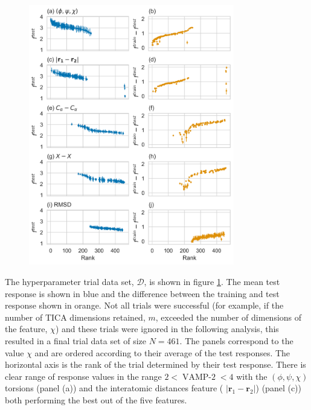 \begin{figure}[p]
    \centering
    \includegraphics[width=0.8\textwidth]{chapters/msm_optimization/figures/aadh_train_test_results.png}
    \label{fig:aad_train_test}
\end{figure}

The hyperparameter trial data set, $\mathcal{D}$, is shown in figure \ref{fig:aad_train_test}. The mean test response is shown in blue and the difference between the training and test response shown in orange. Not all trials were successful (for example, if the number of TICA dimensions retained, $m$, exceeded the number of dimensions of the feature, $\chi$) and these trials were ignored in the following analysis, this resulted in a final trial data set of size $N=461$. The panels correspond to the value $\chi$ and are ordered according to their average of the test responses. The horizontal axis is the rank of the trial determined by their test response. There is clear range of response values in the range $2 < \operatorname{VAMP-2} < 4$ with the $(\phi, \psi, \chi)$ torsions  (panel (a)) and the interatomic distances feature ( $\left|\mathbf{r}_{1}-\mathbf{r}_{2}\right|$) (panel (c)) both performing the best out of the five features. 

